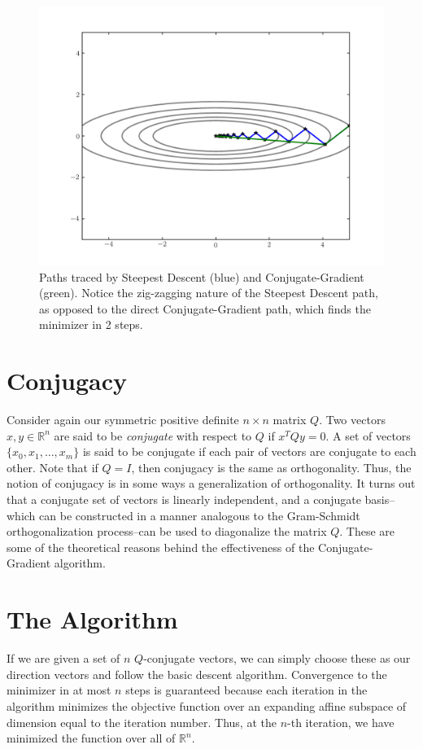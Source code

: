 \begin{figure}
\centering
\includegraphics[width=\textwidth]{steepVsConj.pdf}
\caption{Paths traced by Steepest Descent (blue) and Conjugate-Gradient (green). Notice the
zig-zagging nature of the Steepest Descent path, as opposed to the direct Conjugate-Gradient path,
which finds the minimizer in 2 steps.}
\label{basis:steepVsConj}
\end{figure}

\section*{Conjugacy}
Consider again our symmetric positive definite $n \times n$ matrix $Q$. Two vectors $x, y \in \mathbb{R}^n$ are said to be \emph{conjugate}
with respect to $Q$ if $x^TQy = 0$. A set of vectors $\{x_0, x_1, \ldots, x_m\}$ is said to be conjugate if each pair of vectors are conjugate
to each other. Note that if $Q = I$, then conjugacy is the same as orthogonality. Thus, the notion of conjugacy is in some ways a generalization
of orthogonality. It turns out that a conjugate set of vectors is linearly independent, and a conjugate basis--which can be constructed in a manner
analogous to the Gram-Schmidt orthogonalization process--can be used to diagonalize the matrix $Q$.
These are some of the theoretical reasons behind the effectiveness of the Conjugate-Gradient algorithm.

\section*{The Algorithm}
If we are given a set of $n$ $Q$-conjugate vectors, we can simply choose these as our direction vectors and follow the basic descent algorithm.
Convergence to the minimizer in at most $n$ steps is guaranteed because each iteration in the algorithm minimizes the objective function
over an expanding affine subspace of dimension equal to the iteration number. Thus, at the $n$-th iteration, we have minimized the function over all of
$\mathbb{R}^n$.

